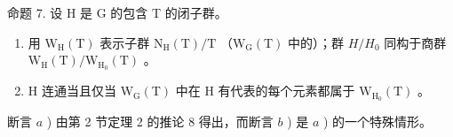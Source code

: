 命题 7. 设 H 是 G 的包含 T 的闭子群。

\begin{enumerate}
\def\labelenumi{\alph{enumi})}
\item
  用 \(\mathrm{W}_{\mathrm{H}}(\mathrm{T})\) 表示子群 \(\mathrm{N}_{\mathrm{H}}(\mathrm{T})/\mathrm{T}\) （\(\mathrm{W}_{\mathrm{G}}(\mathrm{T})\) 中的）；群 \(H/H_{0}\) 同构于商群 \(\mathrm{W}_{\mathrm{H}}(\mathrm{T})/\mathrm{W}_{\mathrm{H}_{0}}(\mathrm{T})\) 。
\item
  H 连通当且仅当 \(\mathrm{W}_{\mathrm{G}}(\mathrm{T})\) 中在 H 有代表的每个元素都属于 \(\mathrm{W}_{\mathrm{H}_{0}}(\mathrm{T})\) 。
\end{enumerate}

断言 \(a\) ) 由第 2 节定理 2 的推论 8 得出，而断言 \(b\) ) 是 \(a\) ) 的一个特殊情形。


